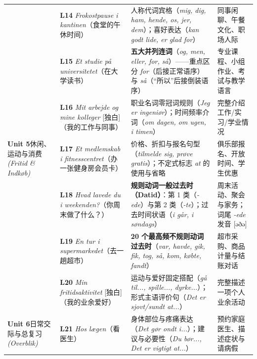 \documentclass[10.5pt, a4paper]{ctexart}
\begin{document}
{\begin{longtable}{@{} >{\raggedright\arraybackslash}p{2.65cm} >{\raggedright\arraybackslash}p{4.6cm} >{\raggedright\arraybackslash}p{5.15cm} >{\raggedright\arraybackslash}p{3.2cm} @{}}
 & \textbf{L14} \textit{Frokostpause i kantinen}\newline （食堂的午休时间） & 人称代词宾格（\textit{mig, dig, ham, hende, os, jer, dem}）；喜好表达（\textit{kan godt lide, er glad for}） & 同事闲聊、午餐文化、职场人际 \\
 & \textbf{L15} \textit{Et studie på universitetet}\newline （在大学读书） & \textbf{五大并列连词}（\textit{og, men, eller, for, så}）——重点区分 \textit{for}（后接正常语序）与 \textit{så}（“所以”后接倒装语序） & 专业课程、小组作业、考试与教学语言 \\
 & \textbf{L16} \textit{Mit arbejde og mine kolleger} [独白]\newline （我的工作与同事） & 职业名词零冠词规则（\textit{Jeg er ingeniør}）；时间频率介词（\textit{om dagen, om ugen, i timen}） & 完整介绍工作/实习/学业情况 \\
\midrule
\textbf{Unit 5}\newline 休闲、运动与消费\newline \textit{(Fritid \& Indkøb)} & \textbf{L17} \textit{Et medlemskab i fitnesscentret}\newline （办一张健身房会员卡） & 价格、折扣与报名句型（\textit{tilmelde sig, prøve gratis}）；不定式标志 \textit{at} 的使用与省略 & 俱乐部报名、开放时间、学生优惠 \\
 & \textbf{L18} \textit{Hvad lavede du i weekenden?}\newline （你周末做了什么？） & \textbf{规则动词一般过去时（Datid）}：第 1 类（\textit{-ede}）与第 2 类（\textit{-te}）；过去时间状语（\textit{i går, i søndags}） & 周末活动、聚会与家务；词尾 \textit{-ede} 发音 [əðə] \\
 & \textbf{L19} \textit{En tur i supermarkedet}\newline （去一趟超市） & \textbf{20 个最高频不规则动词过去时}（\textit{var, havde, gik, fik, tog, så, kom, købte, fandt}） & 超市采购、商品计量与结账对话 \\
 & \textbf{L20} \textit{Min fritidsaktivitet} [独白]\newline （我的业余爱好） & 运动与爱好固定搭配（\textit{gå til..., spille..., dyrke...}）；形式主语评价句（\textit{Det er sjovt/sundt at...}） & 完整描述一项个人业余活动 \\
\midrule
\textbf{Unit 6}\newline 日常交际与总复习\newline \textit{(Overblik)} & \textbf{L21} \textit{Hos lægen}\newline （看医生） & 身体部位与疼痛表达（\textit{Det gør ondt i...}）；建议与必要性（\textit{Du bør..., Det er vigtigt at...}） & 预约家庭医生、描述症状与请病假 \\

\end{longtable}}
\end{document}
